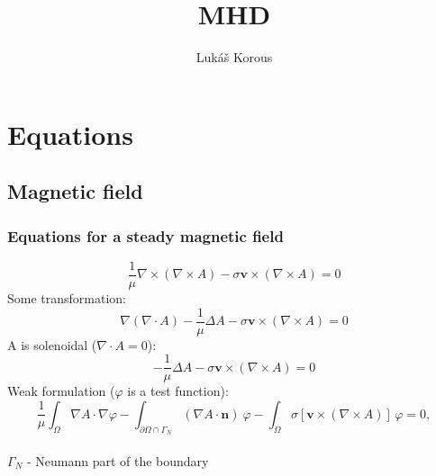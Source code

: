 \documentclass[smallextended]{svjour3}       %
\begin{document}
\title{MHD}


\author{Luk\' a\v s Korous}


\maketitle

\section{Equations}

	\subsection{Magnetic field}
	
		\subsubsection{Equations for a steady magnetic field}
		\begin{equation}
			\frac{1}{\mu}\nabla \times \left(\nabla \times A \right) - \sigma \mathbf{v} \times \left( \nabla \times A \right) = 0
		\end{equation}
		Some transformation:
		\begin{equation}
			\nabla \left(\nabla \cdot A \right) -\frac{1}{\mu}\Delta A - \sigma \mathbf{v} \times \left( \nabla \times A \right) = 0
		\end{equation}
		A is solenoidal ($\nabla \cdot A = 0$):
		\begin{equation}
			-\frac{1}{\mu}\Delta A - \sigma \mathbf{v} \times \left( \nabla \times A \right) = 0
		\end{equation}
		Weak formulation  ($\varphi$ is a test function):
		\begin{equation}
			\frac{1}{\mu}\int_{\Omega}\nabla A \cdot \nabla \varphi - \int_{\partial \Omega \cap \Gamma_{N}} \left(\nabla A \cdot \mathbf{n}\right)\ \varphi 
			 - \int_{\Omega} \sigma \left[\mathbf{v} \times \left( \nabla \times A \right)\right]\,\varphi = 0,
		\end{equation}\ \\
		$\Gamma_{N}$ - Neumann part of the boundary\ \\
		
\end{document}
